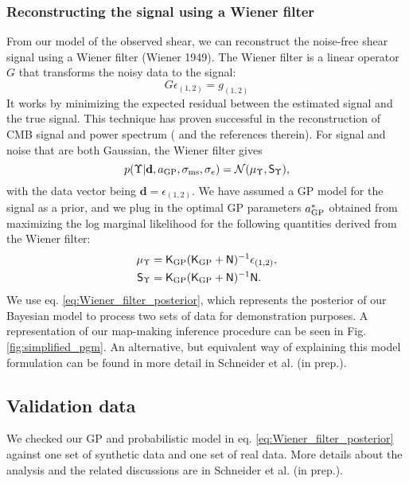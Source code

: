\subsubsection{Reconstructing the signal using a Wiener filter}
From our model of the observed shear, 
we can reconstruct the noise-free shear signal using a Wiener filter (Wiener 1949). 
The Wiener filter is a linear operator $G$ that transforms the noisy
data to the signal:
\begin{equation}
	G\epsilon_{(1, 2)} = g_{(1, 2)}
\end{equation}
It works by minimizing the expected residual between the estimated signal and the true
signal. This technique has proven successful in the reconstruction of CMB signal
and power spectrum (\citealt{Elsner2013} and the references therein).
For signal and noise that are both Gaussian, the Wiener filter gives 
\begin{equation}
	p(\Upsilon| \mathbf{d}, a_{\rm GP}, \sigma_{\rm ms}, \sigma_e) = \mathcal{N}(\mu_\Upsilon,
	\mathsf{S}_\Upsilon),
	\label{eq:Wiener_filter_posterior}
\end{equation}
with the data vector being $\mathbf{d} = \epsilon_{(1, 2)}$. We have assumed 
a GP model for the signal as a prior, and we plug in the
optimal GP parameters $a_{\rm GP}^*$ obtained from maximizing the log marginal
likelihood for the following quantities derived from the Wiener filter:
\begin{align}
\mu_\Upsilon & = \mathsf{K}_{\rm GP}(\mathsf{K}_{\rm GP} + \mathsf{N})^{-1}
\epsilon_{(1, 2)}, \\
\mathsf{S}_\Upsilon & = \mathsf{K}_{\rm GP}(\mathsf{K}_{\rm GP} +
\mathsf{N})^{-1}\mathsf{N}.
\end{align}
We use eq. \ref{eq:Wiener_filter_posterior}, which represents the posterior
of our Bayesian model to process two sets of
data for demonstration purposes. A representation of our map-making inference procedure can be seen in Fig. 
\ref{fig:simplified_pgm}. An alternative, but equivalent way of explaining this
model formulation can be found in more detail in Schneider et al. (in prep.).

\subsection{Validation data}
We checked our GP and probabilistic model in eq. \ref{eq:Wiener_filter_posterior}
against one set of synthetic data and one set of real data.
More details about the analysis and the related discussions are in Schneider et 
al. (in prep.).

